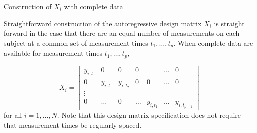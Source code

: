 \begin{example}{Construction of $X_i$ with complete data} \label{example:construction-of-X}

\vspace{.3cm} 

Straightforward construction of the autoregressive design matrix $X_i$ is straight forward in the case that there are an equal number of measurements on each subject at a common set of measurement times $t_1,\dots, t_p$. When complete data are available for measurement times $t_1, \dots, t_p$, 

\begin{equation}
X_i =  \begin{bmatrix} 
y_{i, t_1} & 0 & 0 &0&& \dots & 0 \\
 0 & y_{i, t_1} &  y_{i, t_2}&0 &0& \dots & 0 \\
 \vdots &&&&&&\\
 0 & \dots &0 & \dots& y_{i,t_1} & \dots &  y_{i, t_{p-1}}
\end{bmatrix}
\end{equation}
\noindent
for all $i = 1,\dots, N$. Note that this design matrix specification does not require that measurement times be regularly spaced.  
\end{example}

